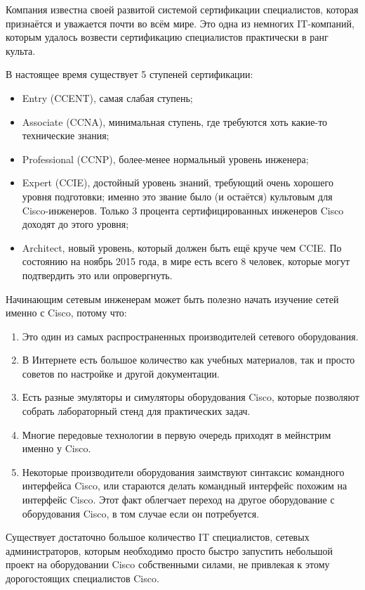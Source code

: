 \documentclass[a4paper,14pt]{extreport}
\begin{document}
	Компания известна своей развитой системой сертификации специалистов, которая признаётся и уважается почти во всём мире. Это одна из немногих IT-компаний, которым удалось возвести сертификацию специалистов практически в ранг культа.
	
	В настоящее время существует 5 ступеней сертификации:
	
	\begin{itemize}
		\item Entry (CCENT), самая слабая ступень;
		\item Associate (CCNA), минимальная ступень, где требуются хоть какие-то технические знания;
		\item Professional (CCNP), более-менее нормальный уровень инженера;
		\item Expert (CCIE), достойный уровень знаний, требующий очень хорошего уровня подготовки; именно это звание было (и остаётся) культовым для Cisco-инженеров. Только 3 процента сертифицированных инженеров Cisco доходят до этого уровня;
		\item Architect, новый уровень, который должен быть ещё круче чем CCIE. По состоянию на ноябрь 2015 года, в мире есть всего 8 человек, которые могут подтвердить это или опровергнуть. 
	\end{itemize}
	
	Начинающим сетевым инженерам может быть полезно начать изучение сетей именно с Cisco, потому что:
	
	\begin{enumerate}
		\item Это один из самых распространенных производителей сетевого оборудования.
		\item В Интернете есть большое количество как учебных материалов, так и просто советов по настройке и другой документации.
		\item Есть разные эмуляторы и симуляторы оборудования Cisco, которые позволяют собрать лабораторный стенд для практических задач.
		\item Многие передовые технологии в первую очередь приходят в мейнстрим именно у Cisco.
		\item Некоторые производители оборудования заимствуют синтаксис командного интерфейса Cisco, или стараются делать командный интерфейс похожим на интерфейс Cisco. Этот факт облегчает переход на другое оборудование с оборудования Cisco, в том случае если он потребуется. 
	\end{enumerate}	
	
	Существует достаточно большое количество IT специалистов, сетевых администраторов, которым необходимо просто быстро запустить небольшой проект на оборудовании Cisco собственными силами, не привлекая к этому дорогостоящих специалистов Cisco.
	
\end{document}
